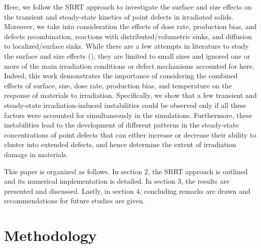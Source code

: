 \documentclass[utf8]{frontiersSCNS} %
\begin{document}
Here, we follow the SRRT approach to investigate the surface and size effects on the transient and steady-state kinetics of point defects in irradiated solids. Moreover, we take into consideration the effects of dose rate, production bias, and defects recombination, reactions with distributed/volumetric sinks, and diffusion to localized/surface sinks. While there are a few attempts in literature to study the surface and size effects (\citep{yang2010,demkowicz2011,xu2012}), they are limited to small sizes and ignored one or more of the main irradiation conditions or defect mechanisms accounted for here. Indeed, this work demonstrates the importance of considering the combined effects of surface, size, dose rate, production bias, and temperature on the response of materials to irradiation. Specifically, we show that a few transient and steady-state irradiation-induced instabilities could be observed only if all these factors were accounted for simultaneously in the simulations. Furthermore, these instabilities lead to the development of different patterns in the steady-state concentrations of point defects that can either increase or decrease their ability to cluster into extended defects, and hence determine the extent of irradiation damage in materials.

This paper is organized as follows. In section 2, the SRRT approach is outlined and its numerical implementation is detailed. In section 3, the results are presented and discussed. Lastly, in section 4, concluding remarks are drawn and recommendations for future studies are given.


\newpage
\section{Methodology}

\end{document}
